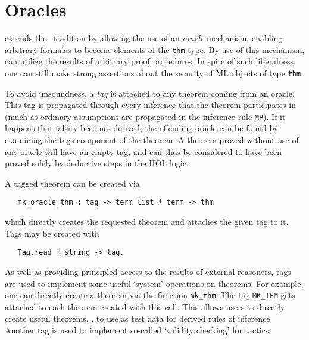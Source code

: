 \section{Oracles}

\holn{} extends the \LCF\ tradition by allowing the use of an \emph
{oracle} mechanism, enabling arbitrary formulas to become elements of
the \verb+thm+ type. By use of this mechanism, \holn{} can utilize the
results of arbitrary proof procedures. In spite of such liberalness, one
can still make strong assertions about the security of ML objects of
type \verb+thm+.

To avoid unsoundness, a \emph{tag} is attached to any theorem
coming from an oracle. This tag is propagated through every
inference that the theorem participates in (much as ordinary assumptions
are propagated in the inference rule {\small\verb+MP+}). If it happens
that falsity becomes derived, the offending oracle can be found by
examining the tags component of the theorem. A theorem proved without
use of any oracle will have an empty tag, and can thus be considered to
have been proved solely by deductive steps in the HOL logic.

A tagged theorem can be created via

\begin{boxed}
\begin{verbatim}
   mk_oracle_thm : tag -> term list * term -> thm
\end{verbatim}\end{boxed}

which directly creates the requested theorem and attaches the given tag to
it. Tags may be created with

\begin{boxed}
\begin{verbatim}
   Tag.read : string -> tag.
\end{verbatim}\end{boxed}

As well as providing principled access to the results of external
reasoners, tags are used to implement some useful `system' operations on
theorems. For example, one can directly create a theorem via the function
\verb+mk_thm+. The tag \verb+MK_THM+ gets attached to each theorem
created with this call. This allows users to directly create useful
theorems, \eg, to use as test data for derived rules of inference.
Another tag is used to implement so-called `validity checking' for tactics.

